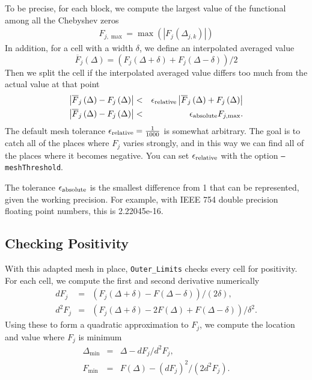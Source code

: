\documentclass[12pt]{article}
\numberwithin{equation}{section}
\begin{document}
To be precise, for each block, we compute the largest value of the
functional among all the Chebyshev zeros
\begin{eqnarray}
  F_{j,\max} = \max \left( \left| F_{j} \left(\Delta_{j,k} \right) \right| \right)
\end{eqnarray}
In addition, for a cell with a width $\delta$, we define an interpolated averaged value
\begin{equation}
  \overline{F}_j\left(\Delta\right) = \left( F_j\left(\Delta + \delta\right) + F_j\left(\Delta - \delta\right) \right) /2
\end{equation}
Then we split the cell if the interpolated averaged value differs too
much from the actual value at that point
\begin{eqnarray}
  \left|\overline{F}_j\left(\Delta\right) - F_j\left(\Delta\right)\right| & < & \epsilon_{\rm{relative}} \left|\overline{F}_j\left(\Delta\right) + F_j\left(\Delta\right)\right| \\
  \left|\overline{F}_j\left(\Delta\right) - F_j\left(\Delta\right)\right| & < & \epsilon_{\rm{absolute}} F_{j,\max}.
\end{eqnarray}
The default mesh tolerance $\epsilon_{\rm{relative}}=\frac{1}{1000}$ is somewhat
arbitrary.  The goal is to catch all of the places where $F_j$ varies
strongly, and in this way we can find all of the places where it
becomes negative.  You can set $\epsilon_{\rm{relative}}$ with the
option \texttt{--meshThreshold}.

The tolerance $\epsilon_{\rm{absolute}}$ is the smallest difference from 1
that can be represented, given the working precision.  For example,
with IEEE 754 double precision floating point numbers, this is
2.22045e-16.

\subsection{Checking Positivity}
\label{subsec:checkingpositivity}

With this adapted mesh in place, \texttt{Outer\_Limits} checks every
cell for positivity. For each cell, we compute the first and
second derivative numerically
\begin{eqnarray}
  dF_{j} & = &\left( F_{j}\left( \Delta + \delta \right) - F\left( \Delta - \delta \right) \right)/\left( 2 \delta \right),\\
  d^{2}F_{j} & = & \left( F_{j}\left( \Delta + \delta \right) - 2 F\left( \Delta \right) + F\left( \Delta - \delta \right) \right)/ \delta^2.
\end{eqnarray}
Using these to form a quadratic approximation to $F_{j}$, we compute
the location and value where $F_{j}$ is minimum
\begin{eqnarray}
  \Delta_{\min} & = & \Delta - dF_{j}/d^{2}F_{j},\\
  F_{\min} & = & F\left(\Delta\right) - \left(dF_{j}\right)^{2} /\left( 2 d^{2}F_{j}\right).
\end{eqnarray}
\end{document}

